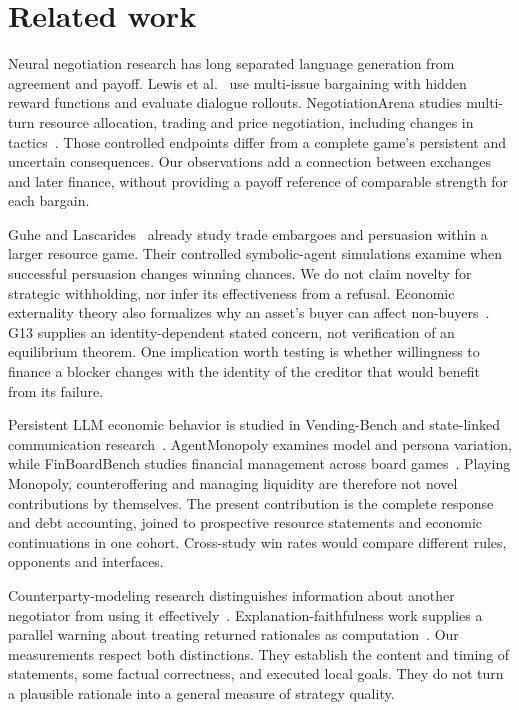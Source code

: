 \section{Related work}
Neural negotiation research has long separated language generation from agreement and payoff. Lewis et al.~\cite{lewis2017deal} use multi-issue bargaining with hidden reward functions and evaluate dialogue rollouts. NegotiationArena studies multi-turn resource allocation, trading and price negotiation, including changes in tactics~\cite{bianchi2024negotiationarena}. Those controlled endpoints differ from a complete game's persistent and uncertain consequences. Our observations add a connection between exchanges and later finance, without providing a payoff reference of comparable strength for each bargain.

Guhe and Lascarides~\cite{guhe2014persuasion} already study trade embargoes and persuasion within a larger resource game. Their controlled symbolic-agent simulations examine when successful persuasion changes winning chances. We do not claim novelty for strategic withholding, nor infer its effectiveness from a refusal. Economic externality theory also formalizes why an asset's buyer can affect non-buyers~\cite{jehiel1996externalities}. G13 supplies an identity-dependent stated concern, not verification of an equilibrium theorem. One implication worth testing is whether willingness to finance a blocker changes with the identity of the creditor that would benefit from its failure.

Persistent LLM economic behavior is studied in Vending-Bench and state-linked communication research~\cite{backlund2025vendingbench,li2026arena}. AgentMonopoly examines model and persona variation, while FinBoardBench studies financial management across board games~\cite{wu2026agentmonopoly,hu2026finboardbench}. Playing Monopoly, counteroffering and managing liquidity are therefore not novel contributions by themselves. The present contribution is the complete response and debt accounting, joined to prospective resource statements and economic continuations in one cohort. Cross-study win rates would compare different rules, opponents and interfaces.

Counterparty-modeling research distinguishes information about another negotiator from using it effectively~\cite{cosentino2026counterparty}. Explanation-faithfulness work supplies a parallel warning about treating returned rationales as computation~\cite{turpin2023unfaithful,lanham2023faithfulness}. Our measurements respect both distinctions. They establish the content and timing of statements, some factual correctness, and executed local goals. They do not turn a plausible rationale into a general measure of strategy quality.

